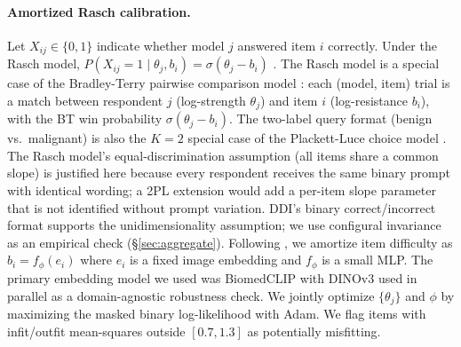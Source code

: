 \documentclass{article}
\begin{document}
\paragraph{Amortized Rasch calibration.}
\label{sec:amortized}
Let $X_{ij} \in \{0, 1\}$ indicate whether model $j$ answered item $i$ correctly. Under the Rasch model, $P(X_{ij} = 1 \mid \theta_j, b_i) = \sigma(\theta_j - b_i)$ \citep[Ch.~2]{truong2026aims}. The Rasch model is a special case of the Bradley-Terry pairwise comparison model \citep{bradley1952rank}: each (model, item) trial is a match between respondent $j$ (log-strength $\theta_j$) and item $i$ (log-resistance $b_i$), with the BT win probability $\sigma(\theta_j - b_i)$. The two-label query format (benign vs.\ malignant) is also the $K=2$ special case of the Plackett-Luce choice model \citep{luce1959individual}. The Rasch model's equal-discrimination assumption (all items share a common slope) is justified here because every respondent receives the same binary prompt with identical wording; a 2PL extension would add a per-item slope parameter that is not identified without prompt variation. DDI's binary correct/incorrect format supports the unidimensionality assumption; we use configural invariance as an empirical check (\S\ref{sec:aggregate}).
Following \citet{truong2025reliableefficientamortizedmodelbased}, we amortize item difficulty as $b_i = f_\phi(e_i)$ where $e_i$ is a fixed image embedding and $f_\phi$ is a small MLP. The primary embedding model we used was BiomedCLIP \citep{zhang2023biomedclip} with DINOv3 \citep{siméoni2025dinov3} used in parallel as a domain-agnostic robustness check. We jointly optimize $\{\theta_j\}$ and $\phi$ by maximizing the masked binary log-likelihood with Adam. We flag items with infit/outfit mean-squares outside $[0.7, 1.3]$ as potentially misfitting. 
\end{document}
